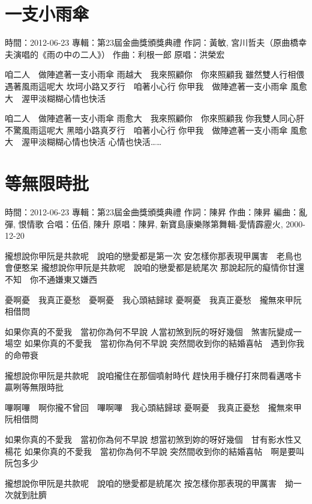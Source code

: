 \documentclass[UTF8,a4paper,oneside,twocolumn,12pt]{ctexbook}
\newcommand{\infopair}[2]{\textbullet #1：#2}
\newcommand{\zc}[1][伍佰]{\infopair{作詞}{#1}}
\newcommand{\zq}[1][伍佰]{\infopair{作曲}{#1}}
\newcommand{\bq}[1][伍佰]{\infopair{編曲}{#1}}
\newcommand{\zj}[1]{\infopair{專輯}{#1}}
\newcommand{\yc}[1]{\infopair{原唱}{#1}}
\newcommand{\sj}[1]{\infopair{時間}{#1}}
\newenvironment{info}{\begin{flushleft}\kaishu
	}
	{\end{flushleft}\normalsize\yahei\par}
\newenvironment{lyric}{
	}
{}
\begin{document}
\section{一支小雨傘}
\begin{info}
	\sj{2012-06-23}
	\zj{第23屆金曲獎頒獎典禮}
	\zc[黃敏, 宮川哲夫（原曲橋幸夫演唱的《雨の中の二人》）]
	\zq[利根一郎]
	\yc{洪榮宏}
\end{info}
\begin{lyric}
	咱二人　做陣遮著一支小雨傘
	雨越大　我來照顧你　你來照顧我
	雖然雙人行相偎　遇著風雨這呢大
	坎坷小路又歹行　咱著小心行
	你甲我　做陣遮著一支小雨傘
	風愈大　渥甲淡糊糊心情也快活

	咱二人　做陣遮著一支小雨傘
	雨愈大　我來照顧你　你來照顧我
	你我雙人同心肝　不驚風雨這呢大
	黑暗小路真歹行　咱著小心行
	你甲我　做陣遮著一支小雨傘
	風愈大　渥甲淡糊糊心情也快活
	心情也快活……
\end{lyric}

\section{等無限時批}
\begin{info}
	\sj{2012-06-23}
	\zj{第23屆金曲獎頒獎典禮}
	\zc[陳昇]
	\zq[陳昇]
	\bq[亂彈, 恨情歌]
	\infopair{合唱}{伍佰, 陳升}
	\yc{陳昇, 新寶島康樂隊第舞輯-愛情霹靂火, 2000-12-20}
\end{info}
\begin{lyric}
	攏想說你甲阮是共款呢　說咱的戀愛都是第一次
	安怎樣你那表現甲厲害　老鳥也會便憨呆
	攏想說你甲阮是共款呢　說咱的戀愛都是統尾次
	那說起阮的癡情你甘還不知　你不通嫌東又嫌西

	憂啊憂　我真正憂愁　憂啊憂　我心頭結歸球
	憂啊憂　我真正憂愁　攏無來甲阮相借問

	如果你真的不愛我　當初你為何不早說
	人當初煞到阮的呀好幾個　煞害阮變成一場空
	如果你真的不愛我　當初你為何不早說
	突然間收到你的結婚喜帖　遇到你我的命帶衰

	攏想說你甲阮是共款呢　說咱攏住在那個噴射時代
	趕快用手機仔打來問看邁喀卡贏咧等無限時批

	嗶啊嗶　啊你攏不曾回　嗶啊嗶　我心頭結歸球
	憂啊憂　我真正憂愁　攏無來甲阮相借問

	如果你真的不愛我　當初你為何不早說
	想當初煞到妳的呀好幾個　甘有影水性又楊花
	如果你真的不愛我　當初你為何不早說
	突然間收到你的結婚喜帖　啊是要叫阮包多少

	攏想說你甲阮是共款呢　說咱的戀愛都是統尾次
	按怎樣你那表現的甲厲害　拗一次就到肚臍
\end{lyric}
\end{document}

